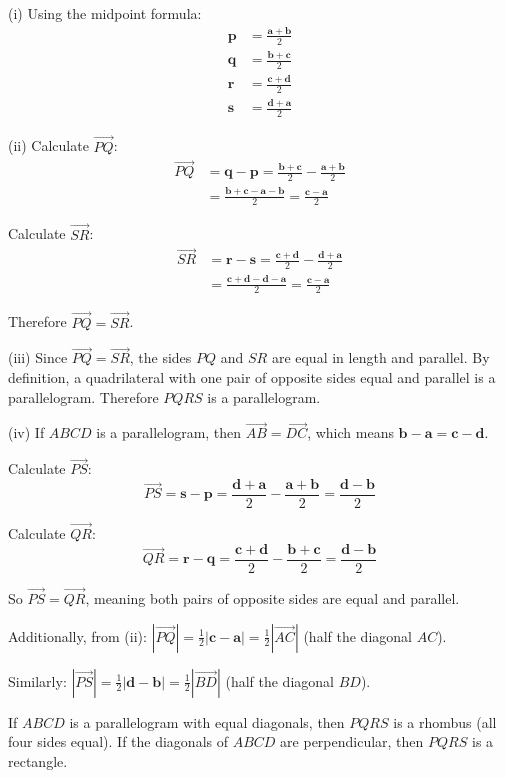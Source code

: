 \begin{solution}[Sketch]
(i) Using the midpoint formula:
\begin{align*}
\mathbf{p} &= \frac{\mathbf{a} + \mathbf{b}}{2} \\
\mathbf{q} &= \frac{\mathbf{b} + \mathbf{c}}{2} \\
\mathbf{r} &= \frac{\mathbf{c} + \mathbf{d}}{2} \\
\mathbf{s} &= \frac{\mathbf{d} + \mathbf{a}}{2}
\end{align*}

(ii) Calculate $\overrightarrow{PQ}$:
\begin{align*}
\overrightarrow{PQ} &= \mathbf{q} - \mathbf{p} = \frac{\mathbf{b} + \mathbf{c}}{2} - \frac{\mathbf{a} + \mathbf{b}}{2} \\
&= \frac{\mathbf{b} + \mathbf{c} - \mathbf{a} - \mathbf{b}}{2} = \frac{\mathbf{c} - \mathbf{a}}{2}
\end{align*}

Calculate $\overrightarrow{SR}$:
\begin{align*}
\overrightarrow{SR} &= \mathbf{r} - \mathbf{s} = \frac{\mathbf{c} + \mathbf{d}}{2} - \frac{\mathbf{d} + \mathbf{a}}{2} \\
&= \frac{\mathbf{c} + \mathbf{d} - \mathbf{d} - \mathbf{a}}{2} = \frac{\mathbf{c} - \mathbf{a}}{2}
\end{align*}

Therefore $\overrightarrow{PQ} = \overrightarrow{SR}$.

(iii) Since $\overrightarrow{PQ} = \overrightarrow{SR}$, the sides $PQ$ and $SR$ are equal in length and parallel. By definition, a quadrilateral with one pair of opposite sides equal and parallel is a parallelogram. Therefore $PQRS$ is a parallelogram.

(iv) If $ABCD$ is a parallelogram, then $\overrightarrow{AB} = \overrightarrow{DC}$, which means $\mathbf{b} - \mathbf{a} = \mathbf{c} - \mathbf{d}$.

Calculate $\overrightarrow{PS}$:
$$\overrightarrow{PS} = \mathbf{s} - \mathbf{p} = \frac{\mathbf{d} + \mathbf{a}}{2} - \frac{\mathbf{a} + \mathbf{b}}{2} = \frac{\mathbf{d} - \mathbf{b}}{2}$$

Calculate $\overrightarrow{QR}$:
$$\overrightarrow{QR} = \mathbf{r} - \mathbf{q} = \frac{\mathbf{c} + \mathbf{d}}{2} - \frac{\mathbf{b} + \mathbf{c}}{2} = \frac{\mathbf{d} - \mathbf{b}}{2}$$

So $\overrightarrow{PS} = \overrightarrow{QR}$, meaning both pairs of opposite sides are equal and parallel.

Additionally, from (ii): $|\overrightarrow{PQ}| = \frac{1}{2}|\mathbf{c} - \mathbf{a}| = \frac{1}{2}|\overrightarrow{AC}|$ (half the diagonal $AC$).

Similarly: $|\overrightarrow{PS}| = \frac{1}{2}|\mathbf{d} - \mathbf{b}| = \frac{1}{2}|\overrightarrow{BD}|$ (half the diagonal $BD$).

If $ABCD$ is a parallelogram with equal diagonals, 
then $PQRS$ is a rhombus (all four sides equal). 
If the diagonals of $ABCD$ are perpendicular, then $PQRS$ is a rectangle.
\end{solution}

